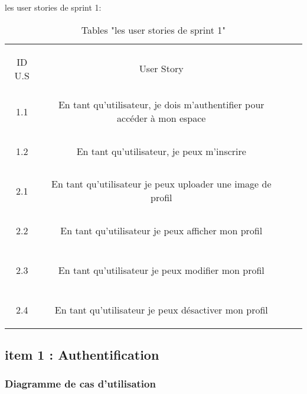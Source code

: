 
\begin{table}[h]
	{\Large \color{cyan} les user stories de sprint 1:}\\
	
	\begin{center}
		\begin{tabular}{>{\begin{bf} } c <{\end{bf}}ccc}
			
			\rowcolor{-blue!20!red}ID U.S & \begin{bf}User Story \end{bf}  & \\
			
			
			1.1  & En tant qu’utilisateur, je dois m’authentifier pour accéder à mon espace \\& \\
			1.2  & En tant qu’utilisateur, je peux m’inscrire \\& \\
			2.1 & En tant qu’utilisateur je peux uploader une image de profil \\& \\
			2.2  & En tant qu’utilisateur je peux afficher mon profil \\& \\
			2.3  & En tant qu’utilisateur je peux modifier mon profil \\& \\
			2.4 & En tant qu’utilisateur je peux désactiver mon profil \\
			
			
		\end{tabular}
	\end{center}
	\caption{Tables  "les user stories de sprint 1"}
	\label{les user stories de sprint 1}
\end{table}
		

\clearpage

\subsection{item 1 : Authentification}
\subsubsection{Diagramme de cas d’utilisation }

